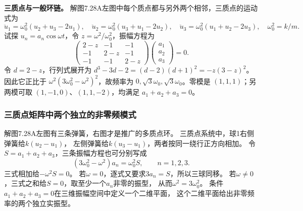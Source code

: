 \documentclass[UTF8,fontset=fandol,a4paper,11pt]{ctexart}
\newcommand{\figcaption}[1]{\par\vspace{2pt}{\small\color{muted}#1}\par}
\begin{document}
\begin{center}\begin{minipage}{\linewidth}\centering{}\figcaption{解图 7.28A}\end{minipage}\end{center}
\par\textbf{三质点与一般环链。} 解图7.28A左图中每个质点都与另外两个相邻，三质点的运动式为
\[\ddot u_1=\omega_0^2(u_2+u_3-2u_1),\quad
\ddot u_2=\omega_0^2(u_3+u_1-2u_2),\quad
\ddot u_3=\omega_0^2(u_1+u_2-2u_3),\quad\omega_0^2=k/m.\]
试探 $u_n=a_n\cos\omega t$，令 $z=\omega^2/\omega_0^2$，振幅方程为
\[
 \begin{pmatrix}2-z&-1&-1\\-1&2-z&-1\\-1&-1&2-z\end{pmatrix}
 \begin{pmatrix}a_1\\a_2\\a_3\end{pmatrix}=0.
\]
令 $d=2-z$，行列式展开为 $d^3-3d-2=(d-2)(d+1)^2=-z(3-z)^2$。
因此它正比于 $\omega^2(3\omega_0^2-\omega^2)^2$，故频率为 $0,\sqrt3\omega_0,\sqrt3\omega_0$。零模是 $(1,1,1)$；另两模可取 $(1,-1,0)$、$(1,1,-2)$，均满足 $a_1+a_2+a_3=0$。

\subsubsection*{三质点矩阵中两个独立的非零频模式}
解图7.28A左图有三条弹簧，右图才是推广的多质点环。
三质点系统中，球1右侧弹簧给$k(u_2-u_1)$，
左侧弹簧给$k(u_3-u_1)$，两者按同一绕行正方向相加。
令$S=a_1+a_2+a_3$，三条振幅方程也可分别写成
\[
(3\omega_0^2-\omega^2)a_n=\omega_0^2S,\qquad n=1,2,3.
\]
三式相加给$-\omega^2S=0$。
若$\omega=0$，逐式又要求$3a_n=S$，所以三球同移。
若$\omega\ne0$，三式之和给$S=0$，取至少一个$a_n$非零的振型，
从而$\omega^2=3\omega_0^2$。
条件$a_1+a_2+a_3=0$在三维振幅空间中定义一个二维平面，
这个二维平面给出非零频率的两个独立实振型。
\end{document}
